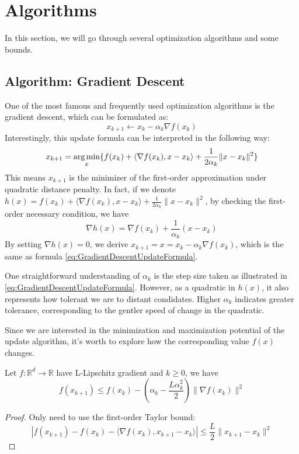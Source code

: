 \chapter{Algorithms}

In this section, we will go through several optimization algorithms and some bounds.

\section{Algorithm: Gradient Descent}
One of the most famous and frequently used optimization algorithms is the gradient descent, which can be formulated as:
\begin{equation}\label{eq:GradientDescentUpdateFormula}
    x_{k+1} \leftarrow x_k - \alpha_k\nabla f(x_k)
\end{equation}
Interestingly, this update formula can be interpreted in the following way:
\begin{equation*}
    x_{k+1} = \operatorname*{arg\,min}_x \{ f(x_k) + \langle \nabla f(x_k), x-x_k \rangle + \frac{1}{2\alpha_k}\|x-x_k\|^2 \}
\end{equation*}
This means $x_{k+1}$ is the minimizer of the first-order approximation under quadratic distance penalty. In fact, if we denote $h(x) = f(x_k) + \langle \nabla f(x_k), x-x_k \rangle + \frac{1}{2\alpha_k}\|x-x_k\|^2$, by checking the first-order necessary condition, we have 
\begin{equation*}
    \nabla h(x) = \nabla f(x_k) + \frac{1}{\alpha_k}(x - x_k)
\end{equation*}
By setting $\nabla h(x) = 0$, we derive $x_{k+1} = x = x_k - \alpha_k\nabla f(x_k)$, which is the same as formula \ref{eq:GradientDescentUpdateFormula}.

\begin{note}
    One straightforward understanding of $\alpha_k$ is the step size taken as illustrated in \ref{eq:GradientDescentUpdateFormula}. However, as a quadratic in $h(x)$, it also represents how tolerant we are to distant condidates. Higher $\alpha_k$ indicates greater tolerance, corresponding to the gentler speed of change in the quadratic. 
\end{note}

Since we are interested in the minimization and maximization potential of the update algorithm, it's worth to explore how the corresponding value $f(x)$ changes. 
\begin{lemma}\label{lemma:DescentLemma}
    Let $f: \mathbb{R}^d \rightarrow \mathbb{R}$ have L-Lipschitz gradient and $k \geq 0$, we have
    \begin{equation*}
        f(x_{k+1}) \leq f(x_k) - (\alpha_k - \frac{L\alpha_k^2}{2}) \| \nabla f(x_k) \|^2
    \end{equation*}
\end{lemma}
\begin{proof}
    Only need to use the first-order Taylor bound:
    \begin{equation*}
        | f(x_{k+1}) - f(x_k) - \langle \nabla f(x_k), x_{k+1} - x_k \rangle | \leq \frac{L}{2}\|x_{k+1} - x_k\|^2
    \end{equation*}
\end{proof}

